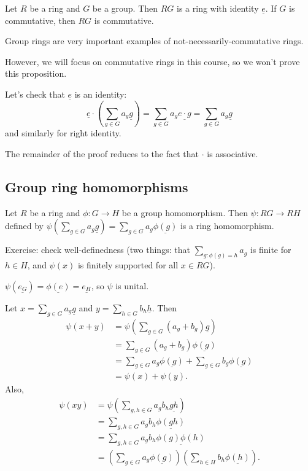 \documentclass[12pt,letterpaper]{report}
\begin{document}
\begin{prop}{}{}
  Let $R$ be a ring and $G$ be a group.
  Then $RG$ is a ring with identity $\underline{e}$.
  If $G$ is commutative, then $RG$ is commutative.
\end{prop}

Group rings are very important examples of not-necessarily-commutative rings.

However, we will focus on commutative rings in this course, so we won't prove this proposition.

Let's check that $\underline{e}$ is an identity:
\[
  \underline{e} \cdot \left(\sum_{g \in G} a_g \underline{g}\right) =
    \sum_{g \in G} a_g \underline{e \cdot g} = \sum_{g \in G} a_g \underline{g}
\]
and similarly for right identity.

The remainder of the proof reduces to the fact that $\cdot$ is associative.

\pagebreak
\subsection{Group ring homomorphisms}

\begin{prop}{}{}
  Let $R$ be a ring and $\phi \colon G \to H$ be a group homomorphism.
  Then $\psi \colon RG \to RH$ defined by
  $\psi\left(\sum_{g \in G} a_g \underline{g}\right) = \sum_{g \in G} a_g \underline{\phi(g)}$ is a
  ring homomorphism.
\end{prop}

\begin{thmproof}
  Exercise: check well-definedness (two things: that $\sum_{g : \phi(g) = h} a_g$ is finite for
  $h \in H$, and $\psi(x)$ is finitely supported for all $x \in RG$).

  $\psi(\underline{e_G}) = \underline{\phi(e)} = \underline{e_H}$, so $\psi$ is unital.

  Let $x = \sum_{g \in G} a_g \underline{g}$ and $y = \sum_{h \in G} b_h \underline{h}$.
  Then
  \begin{align*}
    \psi(x + y)
    &= \psi\left(\sum_{g \in G} (a_g + b_g) \underline{g}\right) \\
    &= \sum_{g \in G} (a_g + b_g) \underline{\phi(g)} \\
    &= \sum_{g \in G} a_g \underline{\phi(g)} + \sum_{g \in G} b_g \underline{\phi(g)} \\
    &= \psi(x) + \psi(y).
  \end{align*}
  Also,
  \begin{align*}
    \psi(xy)
    &= \psi\left(\sum_{g, h \in G} a_g b_h \underline{gh}\right) \\
    &= \sum_{g, h \in G} a_g b_h \underline{\phi(gh)} \\
    &= \sum_{g, h \in G} a_g b_h \underline{\phi(g)\phi(h)} \\
    &= \left(\sum_{g \in G} a_g \underline{\phi(g)}\right)
      \left(\sum_{h \in H} b_h \underline{\phi(h)}\right).
  \end{align*}
\end{thmproof}
\end{document}
